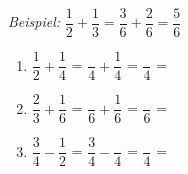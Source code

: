 \begin{enumerate}[label=\arabic*.]
    \textit{Beispiel:} $\dfrac{1}{2} + \dfrac{1}{3} = \dfrac{3}{6} + \dfrac{2}{6} = \dfrac{5}{6}$

    \vspace{0.5cm}
    \begin{enumerate}[label=\alph*)]
        \item $\dfrac{1}{2} + \dfrac{1}{4}$ = $\dfrac{\phantom{2}}{4} + \dfrac{1}{4}$ = $\dfrac{\phantom{5}}{4}$ = \underline{\hspace{3cm}}

        \vspace{0.5cm}
        \item $\dfrac{2}{3} + \dfrac{1}{6}$ = $\dfrac{\phantom{2}}{6} + \dfrac{1}{6}$ = $\dfrac{\phantom{5}}{6}$ = \underline{\hspace{3cm}}

        \vspace{0.5cm}
        \item $\dfrac{3}{4} - \dfrac{1}{2}$ = $\dfrac{3}{4} - \dfrac{\phantom{2}}{4}$ = $\dfrac{\phantom{5}}{4}$ = \underline{\hspace{3cm}}
    \end{enumerate}
\end{enumerate}